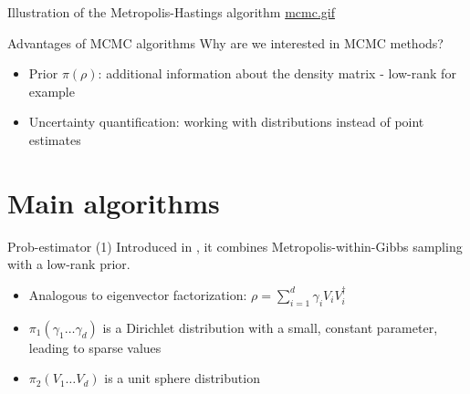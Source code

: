 \documentclass{beamer}
\begin{document}

\begin{frame}{Illustration of the Metropolis-Hastings algorithm}
    \href{run:./mcmc.gif}{mcmc.gif}

\end{frame}

\begin{frame}{Advantages of MCMC algorithms}
    Why are we interested in MCMC methods?
    \begin{itemize}
        \item Prior $\pi(\rho)$: additional information about the density matrix - low-rank for example
        \item Uncertainty quantification: working with distributions instead of point estimates
    \end{itemize} 
\end{frame}
\section{Main algorithms}
\begin{frame}{Prob-estimator (1)}
    Introduced in \cite{MA17}, it combines Metropolis-within-Gibbs sampling with a low-rank prior.
    \begin{itemize}
        \item Analogous to eigenvector factorization: $\rho = \sum_{i=1}^{d} \gamma_i V_i V_i^\dagger$
        \item $\pi_1(\gamma_1 \dots \gamma_d)$ is a Dirichlet distribution with a small, constant parameter, leading to sparse values 
        \item $\pi_2(V_1 \dots V_d)$ is a unit sphere distribution
    \end{itemize}
\end{frame}
\end{document}
